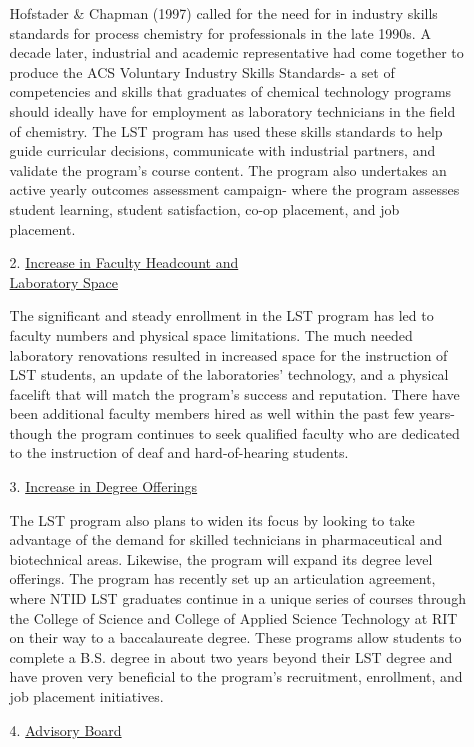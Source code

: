 \documentclass[11.5pt]{sig-alternate} %
\begin{document}
\begin{large}
\begin{enumerate}[label=\Alph*)]
\begin{enumerate}
\begin{sloppypar}
        Hofstader \& Chapman (1997) called for the need for in industry skills standards for process chemistry for professionals in the late 1990s. A decade later, industrial and academic representative had come together to produce the ACS Voluntary Industry Skills Standards- a set of competencies and skills that graduates of chemical technology programs should ideally have for employment as laboratory technicians in the field of chemistry. The LST program has used these skills standards to help guide curricular decisions, communicate with industrial partners, and validate the program’s course content. The program also undertakes an active yearly outcomes assessment campaign- where the program assesses student learning, student satisfaction, co-op placement, and job placement.\end{sloppypar}
        \item[2.] \underline{Increase in Faculty Headcount and} \\ \underline{Laboratory Space}
        \begin{sloppypar}The significant and steady enrollment in the LST program has led to faculty numbers and physical space limitations. The much needed laboratory renovations resulted in increased space for the instruction of LST students, an update of the laboratories’ technology, and a physical facelift that will match the program’s success and reputation. There have been additional faculty members hired as well within the past few years- though the program continues to seek qualified faculty who are dedicated to the instruction of deaf and hard-of-hearing students.\end{sloppypar}
        \item[3.] \underline{Increase in Degree Offerings}
        \begin{sloppypar}The LST program also plans to widen its focus by looking to take advantage of the demand for skilled technicians in pharmaceutical and biotechnical areas. Likewise, the program will expand its degree level offerings. The program has recently set up an articulation agreement, where NTID LST graduates continue in a unique series of courses through the College of Science and College of Applied Science Technology at RIT on their way to a baccalaureate degree. These programs allow students to complete a B.S. degree in about two years beyond their LST degree and have proven very beneficial to the program’s recruitment, enrollment, and job placement initiatives. \end{sloppypar}
        \item[4.] \underline{Advisory Board}

\end{enumerate}
\end{enumerate}
\end{large}
\end{document}

